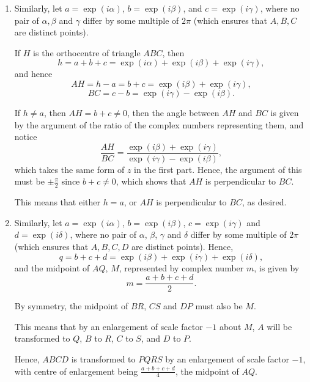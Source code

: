 \begin{enumerate}
    \item Similarly, let \(a = \exp(i \alpha)\), \(b = \exp(i \beta)\), and \(c = \exp(i \gamma)\), where no pair of \(\alpha, \beta\) and \(\gamma\) differ by some multiple of \(2\pi\) (which ensures that \(A, B, C\) are distinct points).

          If \(H\) is the orthocentre of triangle \(ABC\), then
          \[
              h = a + b + c = \exp (i \alpha) + \exp (i \beta) + \exp (i \gamma),
          \]
          and hence
          \[
              AH = h - a = b + c = \exp (i \beta) + \exp (i \gamma),
          \]
          \[
              BC = c - b = \exp (i \gamma) - \exp (i \beta).
          \]

          If \(h \neq a\), then \(AH = b + c \neq 0\), then the angle between \(AH\) and \(BC\) is given by the argument of the ratio of the complex numbers representing them, and notice
          \[
              \frac{AH}{BC} = \frac{\exp (i \beta) + \exp (i \gamma)}{\exp (i \gamma) - \exp (i \beta)},
          \]
          which takes the same form of \(z\) in the first part. Hence, the argument of this must be \(\pm \frac{\pi}{2}\) since \(b + c \neq 0\), which shows that \(AH\) is perpendicular to \(BC\).

          This means that either \(h = a\), or \(AH\) is perpendicular to \(BC\), as desired.

    \item Similarly, let \(a = \exp(i \alpha)\), \(b = \exp(i \beta)\), \(c = \exp(i \gamma)\) and \(d = \exp(i \delta)\), where no pair of \(\alpha\), \(\beta\), \(\gamma\) and \(\delta\) differ by some multiple of \(2\pi\) (which ensures that \(A, B, C, D\) are distinct points). Hence,
          \[
              q = b + c + d = \exp(i \beta) + \exp(i \gamma) + \exp(i \delta),
          \]
          and the midpoint of \(AQ\), \(M\), represented by complex number \(m\), is given by
          \[
              m = \frac{a + b + c + d}{2}.
          \]

          By symmetry, the midpoint of \(BR\), \(CS\) and \(DP\) must also be \(M\).

          This means that by an enlargement of scale factor \(-1\) about \(M\), \(A\) will be transformed to \(Q\), \(B\) to \(R\), \(C\) to \(S\), and \(D\) to \(P\).

          Hence, \(ABCD\) is transformed to \(PQRS\) by an enlargement of scale factor \(-1\), with centre of enlargement being \(\frac{a + b + c + d}{4}\), the midpoint of \(AQ\).
\end{enumerate}